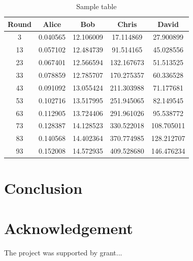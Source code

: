 \documentclass[en]{prtclass}
\begin{document}
\begin{table}[ht]
    \centering
    \caption{Sample table}
    \label{tab:elapsed time}
    \begin{tabular}{|c||c|c|c|c|}
        \hline
        Round & Alice &  Bob & Chris & David \\ 
        \hline 
        3 & 0.040565 & 12.106009 & 17.114869 & 27.900899 \\
        \hline
        13 & 0.057102 & 12.484739 & 91.514165 & 45.028556 \\
        \hline
        23 & 0.067401 & 12.566594 & 132.167673 & 51.513525 \\
        \hline
        33 & 0.078859 & 12.785707 & 170.275357 & 60.336528 \\
        \hline
        43 & 0.091092 & 13.055424 & 211.303988 & 71.177681 \\
        \hline
        53 & 0.102716 & 13.517995 & 251.945065 & 82.149545 \\
        \hline
        63 & 0.112905 & 13.724406 & 291.961026 & 95.538772 \\
        \hline
        73 & 0.128387 & 14.128523 & 330.522018 & 108.705011 \\
        \hline
        83 & 0.140568 & 14.402364 & 370.774985 & 128.212707 \\
        \hline
        93 & 0.152008 & 14.572935 & 409.528680 & 146.476234 \\
        \hline
    \end{tabular}
\end{table}


\section{Conclusion}
\blindtext[2]


\section*{Acknowledgement}
The project was supported by grant...



\end{document}
